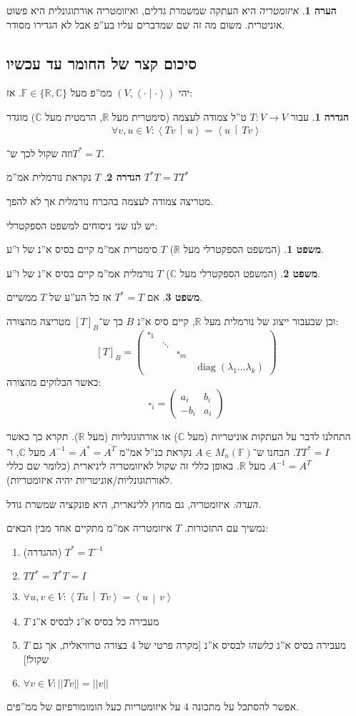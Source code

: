 \documentclass[a4paper]{article}
\newcommand\R     {\mathbb{R}}
\newcommand\C     {\mathbb{C}}
\newcommand\ra    {\rangle}
\newcommand\la    {\langle}
\newcommand\ol    {\overline}
\DeclareMathOperator{\diag}    {diag}
\newcommand\F         {\mathbb{F}}
\newcommand\co        {\colon}
\newcommand\pms[1]    {\begin{pmatrix}
		#1
\end{pmatrix}}
\newcommand\norm[1]   {\left \vert \left \vert #1 \right \vert \right \vert}
\newcommand\smut      {\left \la \cdot \mid \cdot \right \ra}
\newcommand\mut [2]   {\left \la #1 \,\middle\vert\, #2 \right \ra}
\renewcommand\lg      {\lambda}
\newcommand\op    {^{-1}}
\theoremstyle{definition}
\newtheorem{Theorem}{משפט}
\newtheorem{definition}{הגדרה}
\newtheorem{Remark}{הערה}
\newcommand\theo  [1] {\begin{Theorem}#1\end{Theorem}}
\newcommand\defi  [1] {\begin{definition}#1\end{definition}}
\newcommand\rmark [1] {\begin{Remark}#1\end{Remark}}
\begin{document}
	
	\rmark{\textit{איזומטריה} היא העתקה שמשמרת גדלים, ואיזומטריה אורתוגונלית היא פשוט אוניטרית. משום מה זה שם שמדברים עליו בע''פ אבל לא הגדירו מסודר. }
	
	\subsection{סיכום קצר של החומר עד עכשיו}
	יהי $(V, \smut)$ ממ''פ מעל $\F \in \{\R, \C\}$. אז: 
	\defi{עבור $T \co V \to V$ ט''ל צמודה לעצמה (סימטרית מעל $\R$, הרמטית מעל $\C$) מוגדר
		\[ \forall v, u \in V \co \mut{Tv}{u} = \mut{u}{Tv} \]}
	וזה שקול לכך ש־$T^* = T$. 
	\defi{$T$ נקראת נורמלית אמ''מ $T^*T = TT^*$}
	
	מטריצה צמודה לעצמה בהכרח נורמלית אך לא להפך. 
	
	יש לנו שני ניסוחים למשפט הספקטרלי: 
	
	\theo{(המשפט הספקטרלי מעל $\R$) $T$ סימטרית אמ''מ קיים בסיס א''נ של ו''ע. }
	\theo{(המשפט הספקטרלי מעל $\C$) $T$ נורמלית אמ''מ קיים בסיס א''נ של ו''ע. }
	
	\theo{אם $T^* = T$ אז כל הע''ע של $T$ ממשיים. }
	וכן שבעבור ייצוג של נורמלית מעל $\R$, קיים סיס א''נ $B$ כך ש־$[T]_B$ מטריצה מהצורה: 
	\[ [T]_B = \pms{\square_1 \\ & \ddots \\ &&\square_m \\ &&& \diag(\lg_1 \dots \lg_k)} \]
	כאשר הבלוקים מהצורה: 
	\[ \square_i = \pms{a_i & b_i \\ -b_i & a_i} \]
	
	
	
	התחלנו לדבר על העתקות אוניטריות (מעל $\C$) או אורתוגונליות (מעל $\R$). תקרא כך כאשר $TT^* = I$. הבחנו ש־$A \in M_n(\F)$ נקראת כנ''ל אמ''מ $A\op = A^* = \ol{A^T}$ מעל $\C$, ו־$A\op = A^T$ מעל $\R$. באופן כללי זה שקול לאיזומטריה ליניארית (כלומר שם כללי לאורתוגונליות/אוניטריות יהיה איזומטריות). 
	
	\textit{הערה: }איזומטריה, גם מחוץ ללינארית, היא פונקציה שמשרת גודל. 
	
	נמשיך עם התזכורות. $T$ איזומטריה אמ''מ מתקיים אחד מבין הבאים: 
	\begin{enumerate}
		\item (ההגדרה) \hfill $T^* = T\op$
		\item \hfill $TT^* = T^*T = I$
		\item \hfill $\forall u, v \in V \co \mut{Tu}{Tv} = \mut{u}{v}$
		\item $T$ מעבירה כל בסיס א''נ לבסיס א''נ
		\item $T$ מעבירה בסיס א''נ \textit{כלשהו} לבסיס א''נ [מקרה פרטי של 4 בצורה טרוויאלית, אך גם שקול!]
		\item \hfil $\forall v \in V \co \norm{Tv} = \norm{v}$
	\end{enumerate}
	אפשר להסתכל על מתכונה 4 על איזומטריות כעל הומומורפיזם של ממ''פים. 
	
\end{document}
